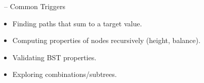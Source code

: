 \begin{frame}{\secname\ -- Common Triggers}
  \begin{itemize}
    \item Finding paths that sum to a target value.
        \item Computing properties of nodes recursively (height, balance).
        \item Validating BST properties.
        \item Exploring combinations/subtrees.
  \end{itemize}
\end{frame}
